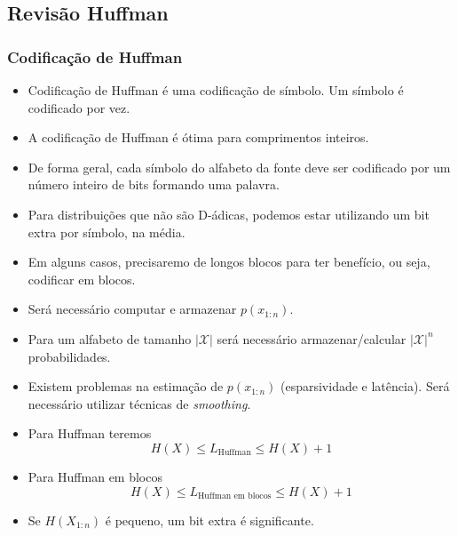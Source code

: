 \subsection{Revisão Huffman}

\begin{frame}[allowframebreaks]
  \frametitle{Codificação de Huffman}
  \begin{itemize}
  \item Codificação de Huffman é uma codificação de símbolo. Um símbolo é codificado por vez.
  \item A codificação de Huffman é ótima para comprimentos inteiros.
  \item De forma geral, cada símbolo do alfabeto da fonte deve ser codificado por um número inteiro de bits 
	formando uma palavra.
  \item Para distribuições que não são D-ádicas, podemos estar utilizando um bit extra por símbolo, na média.
  \item Em alguns casos, precisaremo de longos blocos para ter benefício, ou seja, codificar em blocos.
  \item Será necessário computar e armazenar $p(x_{1:n})$.
  \item Para um alfabeto de tamanho $\vert \mathcal{X} \vert$ será necessário armazenar/calcular 
	$\vert \mathcal{X} \vert^n$ probabilidades.
  \item Existem problemas na estimação de $p(x_{1:n})$ (esparsividade e latência). 
	Será necessário utilizar técnicas de \textit{smoothing}.
  \item Para Huffman teremos
	\begin{equation}
	H(X) \leq L_{\text{Huffman}} \leq H(X)+1
	\end{equation}
  \item Para Huffman em blocos
	\begin{equation}
        H(X) \leq L_{\text{Huffman em blocos}} \leq H(X)+1
        \end{equation}
  \item Se $H(X_{1:n})$ é pequeno, um bit extra é significante.
  \end{itemize}
\end{frame}


